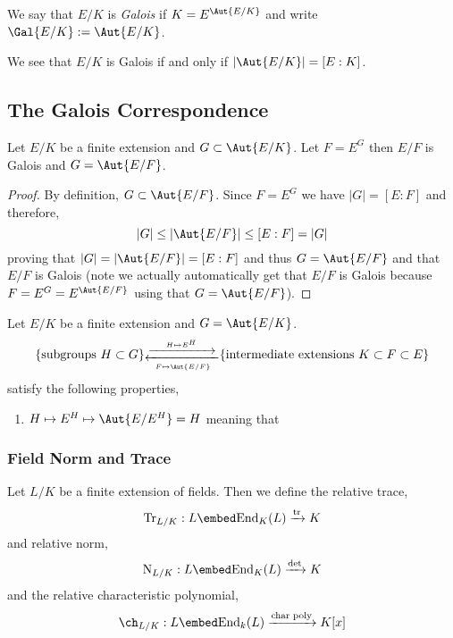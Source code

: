 \documentclass[12pt]{article}
\begin{document}
\begin{defn}
We say that $E / K$ is \textit{Galois} if $K = E^{\Aut{E/K}}$ and write $\Gal{E/K} := \Aut{E/K}$.
\end{defn}

\begin{cor}
We see that $E / K$ is Galois if and only if $|\Aut{E/K}| = [E : K]$.
\end{cor}

\subsection{The Galois Correspondence}

\begin{prop}
Let $E/K$ be a finite extension and $G \subset \Aut{E/K}$. Let $F = E^G$ then $E/F$ is Galois and $G = \Aut{E/F}$.
\end{prop}

\begin{proof}
By definition, $G \subset \Aut{E/F}$. Since $F = E^G$ we have $|G| = [E : F]$ and therefore,
\[ |G| \le |\Aut{E/F}| \le [E : F] = |G| \]
proving that $|G| = |\Aut{E/F}| = [E : F]$ and thus $G = \Aut{E/F}$ and that $E/F$ is Galois (note we actually automatically get that $E/F$ is Galois because $F = E^G = E^{\Aut{E/F}}$ using that $G = \Aut{E/F}$).
\end{proof}

\begin{prop}
Let $E/K$ be a finite extension and $G = \Aut{E/K}$.
\[ \{ \text{subgroups } H \subset G \} \substack{ \xrightarrow{\quad H \mapsto E^H \quad}  \\ \xleftarrow[F \mapsto \Aut{E/F}]{} } \{ \text{intermediate extensions } K \subset F \subset E \} \]
satisfy the following properties,
\begin{enumerate}
\item $H \mapsto E^H \mapsto \Aut{E/E^H} = H$ meaning that 
\end{enumerate}
\end{prop}


\subsubsection{Field Norm and Trace}

\renewcommand{\Tr}{\mathrm{Tr}}
\newcommand{\Nm}{\mathrm{N}}

\begin{defn}
Let $L/K$ be a finite extension of fields. Then we define the relative trace, 
\[ \Tr_{L/K} : L \embed \mathrm{End}_K(L) \xrightarrow{\mathrm{tr}} K \]
and relative norm,
\[ \Nm_{L/K} : L \embed \mathrm{End}_K(L) \xrightarrow{\det} K \]
and the relative characteristic polynomial,
\[ \ch_{L/K} : L \embed \mathrm{End}_k(L) \xrightarrow{\text{char poly}} K[x] \]
\end{defn}
\end{document}
